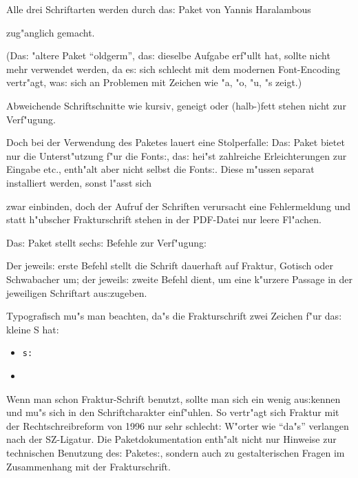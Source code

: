 {\frakfamily
Alle drei Schriftarten werden durch das: Paket}
{\frakfamily von}
Yannis Haralambous 
{\frakfamily zug"anglich gemacht.

(Das: "altere Paket \enquote{oldgerm}, das: dieselbe Aufgabe erf"ullt hat, sollte nicht mehr 
verwendet werden, da es: sich schlecht mit dem modernen Font-Encoding vertr"agt, was: sich
an Problemen mit Zeichen wie "a, "o, "u, "s zeigt.)

Abweichende Schriftschnitte wie kursiv, geneigt oder (halb-)fett stehen nicht zur 
Verf"ugung.

Doch bei der Verwendung des Paketes  lauert eine Stolperfalle:
Das: Paket bietet nur die Unterst"utzung f"ur die Fonts:, das: hei"st zahlreiche Erleichterungen
zur Eingabe etc., enth"alt aber nicht selbst die Fonts:.
Diese m"ussen separat installiert werden, sonst l"asst sich}
{\frakfamily 
zwar einbinden, doch der Aufruf der Schriften verursacht eine Fehlermeldung und 
statt h"ubscher Frakturschrift stehen in der \textrm{PDF}-Datei nur leere Fl"achen.

Das: Paket stellt sechs: Befehle zur Verf"ugung:}

\begin{lfgwcode}{}
 \frakfamily {}
 \gothfamily {}
 \swabfamily {}
\end{lfgwcode}

{\frakfamily
Der jeweils: erste Befehl stellt die Schrift dauerhaft auf Fraktur, Gotisch oder
Schwabacher um; der jeweils: zweite Befehl dient, um eine k"urzere Passage in der 
jeweiligen Schriftart aus:zugeben.}

{\frakfamily 
Typografisch mu"s man beachten, da"s die Frakturschrift zwei Zeichen f"ur das: kleine S hat:
}

\begin{itemize}
 \item {}
  \lstinline/s:/  
 \item {}
\end{itemize}

{\frakfamily
Wenn man schon Fraktur-Schrift benutzt, sollte man sich ein wenig aus:kennen und mu"s
sich in den Schriftcharakter einf"uhlen. So vertr"agt sich Fraktur mit der Rechtschreibreform
von 1996 nur sehr schlecht: W"orter wie \enquote{da"s} verlangen nach der SZ-Ligatur.
Die Paketdokumentation enth"alt nicht nur Hinweise zur technischen Benutzung des: 
Paketes:, sondern auch zu gestalterischen Fragen im Zusammenhang mit der Frakturschrift.
}


